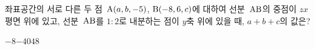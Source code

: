 좌표공간의 서로 다른 두 점~$\mathrm{A}(a{,}\mkern3mu\mathopen{}b{,}\mkern3mu\mathopen{}-5)$, $\mathrm{B}(-8{,}\mkern3mu\mathopen{}6{,}\mkern3mu\mathopen{}c)$에 대하여 선분~$\mathrm{AB}$의 중점이 $zx$평면 위에 있고, 선분~$\mathrm{AB}$를 $1:2$로 내분하는 점이 $y$축 위에 있을 때, $a+b+c$의 값은?
\begin{choices32}{$-8$}{$-4$}{$0$}{$4$}{$8$}\end{choices32}
